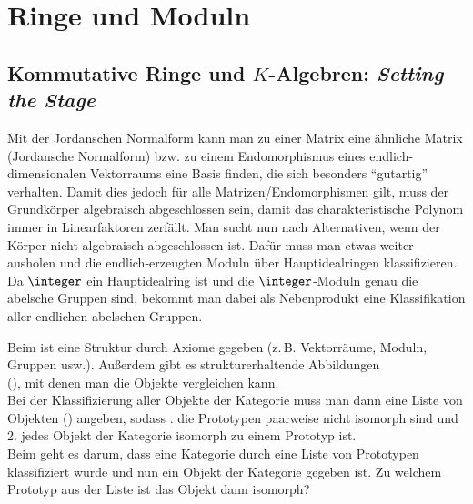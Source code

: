\chapter{%
    Ringe und Moduln%
}

\section{%
    Kommutative Ringe und \texorpdfstring{$K$}{K}-Algebren: \emph{Setting the Stage}%
}

\begin{Bem}
    Mit der Jordanschen Normalform kann man zu einer Matrix eine ähnliche
    Matrix (Jordansche Normalform) bzw. zu einem Endomorphismus eines
    endlich-dimensionalen Vektorraums eine Basis finden, die sich besonders
    "`gutartig"' verhalten.
    Damit dies jedoch für alle Matrizen/Endomorphismen gilt, muss der
    Grundkörper algebraisch abgeschlossen sein, damit das charakteristische
    Polynom immer in Linearfaktoren zerfällt.
    Man sucht nun nach Alternativen, wenn der Körper nicht algebraisch
    abgeschlossen ist.
    Dafür muss man etwas weiter ausholen und die endlich-erzeugten Moduln
    über Hauptidealringen klassifizieren. \\
    Da $\integer$ ein Hauptidealring ist und die $\integer$-Moduln
    genau die abelsche Gruppen sind, bekommt man dabei als Nebenprodukt
    eine Klassifikation aller endlichen abelschen Gruppen.
\end{Bem}

\begin{Bem}
    Beim  ist eine Struktur durch Axiome
    gegeben (z.\,B. Vektorräume, Moduln, Gruppen usw.).
    Außerdem gibt es strukturerhaltende Abbildungen\\
    (),
    mit denen man die Objekte vergleichen kann. \\
    Bei der Klassifizierung aller Objekte der Kategorie muss man dann eine
    Liste von Objekten () angeben, sodass . die Prototypen paarweise nicht isomorph sind und \\
    2. jedes Objekt der Kategorie isomorph zu einem Prototyp ist. \\
    Beim  geht es darum, dass eine Kategorie
    durch eine Liste von Prototypen klassifiziert wurde und nun
    ein Objekt der Kategorie gegeben ist.
    Zu welchem Prototyp aus der Liste ist das Objekt dann isomorph?
\end{Bem}

